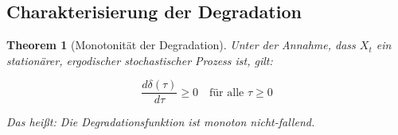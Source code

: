 \documentclass[a4paper, 12pt, twoside, openright]{report}
\newtheorem{theorem}{Theorem}[section]
\theoremstyle{definition}
\theoremstyle{definition}
\begin{document}
\subsection{Charakterisierung der Degradation}

\begin{theorem}[Monotonität der Degradation]
\label{thm:monotone}
Unter der Annahme, dass $X_t$ ein stationärer, ergodischer stochastischer Prozess ist, gilt:

\begin{equation}
\frac{d\delta(\tau)}{d\tau} \geq 0 \quad \text{für alle } \tau \geq 0
\end{equation}

Das heißt: Die Degradationsfunktion ist monoton nicht-fallend.
\end{theorem}
\end{document}
